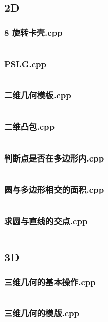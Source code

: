 \documentclass[a4paper,11pt]{article}
\begin{document}
\subsection{2D}
\subsubsection{8 旋转卡壳.cpp}
\inputminted{c++}{"D:/tmplz/templates/几何/2D/8 旋转卡壳.cpp"}
\subsubsection{PSLG.cpp}
\inputminted{c++}{"D:/tmplz/templates/几何/2D/PSLG.cpp"}
\subsubsection{二维几何模板.cpp}
\inputminted{c++}{"D:/tmplz/templates/几何/2D/二维几何模板.cpp"}
\subsubsection{二维凸包.cpp}
\inputminted{c++}{"D:/tmplz/templates/几何/2D/二维凸包.cpp"}
\subsubsection{判断点是否在多边形内.cpp}
\inputminted{c++}{"D:/tmplz/templates/几何/2D/判断点是否在多边形内.cpp"}
\subsubsection{圆与多边形相交的面积.cpp}
\inputminted{c++}{"D:/tmplz/templates/几何/2D/圆与多边形相交的面积.cpp"}
\subsubsection{求圆与直线的交点.cpp}
\inputminted{c++}{"D:/tmplz/templates/几何/2D/求圆与直线的交点.cpp"}
\subsection{3D}
\subsubsection{三维几何的基本操作.cpp}
\inputminted{c++}{"D:/tmplz/templates/几何/3D/三维几何的基本操作.cpp"}
\subsubsection{三维几何的模版.cpp}
\inputminted{c++}{"D:/tmplz/templates/几何/3D/三维几何的模版.cpp"}
\end{document}
